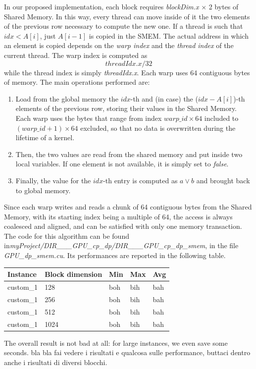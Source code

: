 \documentclass[12pt]{extarticle}
\begin{document}
In our proposed implementation, each block requires \emph{blockDim.x} $\times$ 2 bytes of Shared Memory. In this way, every thread can move inside of it the two elements of the previous row necessary to compute the new one. If a thread is such that $idx < A[i]$, just $A[i-1]$ is copied in the SMEM. The actual address in which an element is copied depends on the \emph{warp index} and the \emph{thread index} of the current thread. The warp index is computed as
\[threadIdx.x / 32\]
while the thread index is simply \emph{threadIdx.x}.\newline
Each warp uses 64 contiguous bytes of memory. The main operations performed are:
\begin{enumerate}
    \item Load from the global memory the $idx$-th and (in case) the ($idx - A[i]$)-th elements of the previous row, storing their values in the Shared Memory. Each warp uses the bytes that range from index $warp\_id \times 64$ included to $(warp\_id + 1) \times 64$ excluded, so that no data is overwritten during the lifetime of a kernel.
    \item Then, the two values are read from the shared memory and put inside two local variables. If one element is not available, it is simply set to \emph{false}.
    \item Finally, the value for the $idx$-th entry is computed as $a \lor b$ and brought back to global memory.
\end{enumerate}
Since each warp writes and reads a chunk of 64 contiguous bytes from the Shared Memory, with its starting index being a multiple of 64, the access is always coalesced and aligned, and can be satisfied with only one memory transaction.\newline
The code for this algorithm can be found in\newline \emph{myProject/DIR\_\_\_GPU\_cp\_dp/DIR\_\_\_GPU\_cp\_dp\_smem}, in the file \emph{GPU\_dp\_smem.cu}.\newline
Its performances are reported in the following table.
\begin{center}
\begin{tabular}{ | m{2.2cm} | m{3.2cm} | m{2.2cm} | m{2.2cm} | m{2.2cm} |}
 \hline
 Instance & Block dimension & Min & Max & Avg\\
 \hline
 custom\_1 & 128 & boh & bih & bah\\
 \hline
 custom\_1 & 256 & boh & bih & bah\\
 \hline
 custom\_1 & 512 & boh & bih & bah\\
 \hline
 custom\_1 & 1024 & boh & bih & bah\\
 \hline
 \end{tabular}
 \end{center}
The overall result is not bad at all: for large instances, we even save some seconds.\newline
bla bla fai vedere i risultati e qualcosa sulle performance, buttaci dentro anche i risultati di diversi blocchi.
\end{document}
